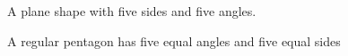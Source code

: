 A plane shape with five sides and five angles. 

\par
A regular pentagon has five equal angles and five equal sides